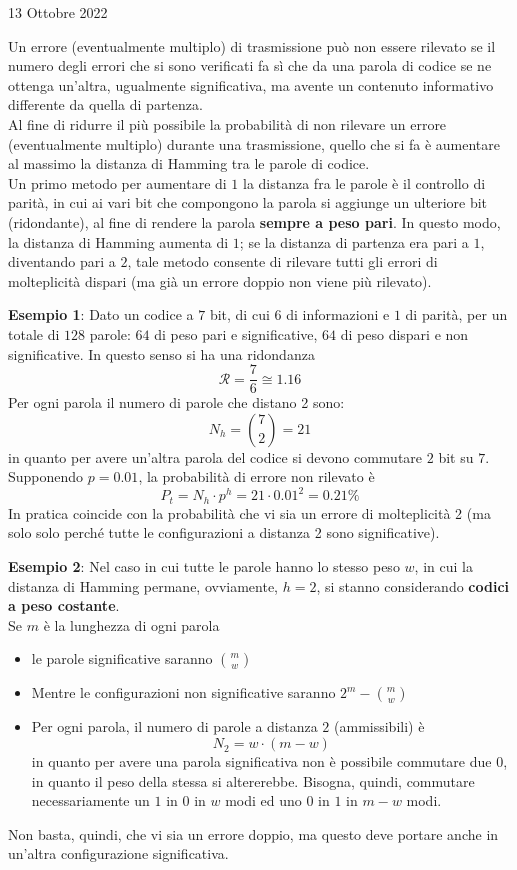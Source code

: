 \documentclass[a4paper]{extarticle}
\begin{document}
\newpage
\begin{center}
    13 Ottobre 2022
\end{center}
Un errore (eventualmente multiplo) di trasmissione può non essere rilevato se il numero degli errori che si sono verificati fa sì che da una parola di codice se ne ottenga un'altra, ugualmente significativa, ma avente un contenuto informativo differente da quella di partenza.\\
Al fine di ridurre il più possibile la probabilità di non rilevare un errore (eventualmente multiplo) durante una trasmissione, quello che si fa è aumentare al massimo la distanza di Hamming tra le parole di codice.\\
Un primo metodo per aumentare di $1$ la distanza fra le parole è il controllo di parità, in cui ai vari bit che compongono la parola si aggiunge un ulteriore bit (ridondante), al fine di rendere la parola \textbf{sempre a peso pari}. In questo modo, la distanza di Hamming aumenta di $1$; se la distanza di partenza era pari a $1$, diventando pari a $2$, tale metodo consente di rilevare tutti gli errori di molteplicità dispari (ma già un errore doppio non viene più rilevato).

\vspace{1em}
\noindent
\textbf{Esempio 1}: Dato un codice a $7$ bit, di cui $6$ di informazioni e $1$ di parità, per un totale di $128$ parole: $64$ di peso pari e significative, $64$ di peso dispari e non significative. In questo senso si ha una ridondanza 
\[\mathcal{R}=\frac{7}{6} \cong 1.16\]
Per ogni parola il numero di parole che distano 2 sono:
\[N_h = \binom{7}{2} = 21\]
in quanto per avere un'altra parola del codice si devono commutare $2$ bit su $7$.\\
Supponendo $p=0.01$, la probabilità di errore non rilevato è
\[P_t = N_h \cdot p^h = 21 \cdot 0.01^2=0.21\%\]
In pratica coincide con la probabilità che vi sia un errore di molteplicità 2 (ma solo solo perché tutte le configurazioni a distanza 2 sono significative).

\vspace{1em}
\noindent
\textbf{Esempio 2}: Nel caso in cui tutte le parole hanno lo stesso peso $w$, in cui la distanza di Hamming permane, ovviamente, $h=2$, si stanno considerando \textbf{codici a peso costante}.\\
Se $m$ è la lunghezza di ogni parola
\begin{itemize}
    \item le parole significative saranno $\displaystyle{\binom{m}{w}}$
    \item Mentre le configurazioni non significative saranno $\displaystyle{2^m-\binom{m}{w}}$
    \item Per ogni parola, il numero di parole a distanza $2$ (ammissibili) è
    \[N_2=w \cdot (m-w)\]
    in quanto per avere una parola significativa non è possibile commutare due $0$, in quanto il peso della stessa si altererebbe. Bisogna, quindi, commutare necessariamente un $1$ in $0$ in $w$ modi ed uno $0$ in $1$ in $m-w$ modi.
\end{itemize}
Non basta, quindi, che vi sia un errore doppio, ma questo deve portare anche in un'altra configurazione significativa.
\end{document}
